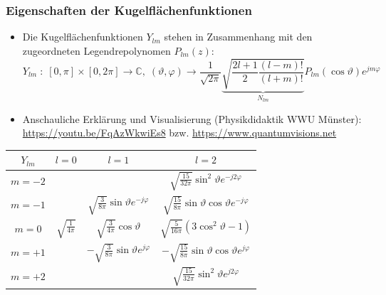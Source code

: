       \begin{frame}
        \frametitle{Eigenschaften der Kugelflächenfunktionen}
        \begin{itemize}[<+->]
        \item Die Kugelflächenfunktionen $Y_{lm}$ stehen in Zusammenhang mit den \alert{zugeordneten Legendrepolynomen} $P_{lm}(z)$:
          $$
          Y_{lm}\; :\; [0,\pi] \times [0,2\pi] \to \mathbb{C}, \; (\vartheta,\varphi) \to \frac{1}{\sqrt{2\pi}} \underbrace{\sqrt{\frac{2l+1}{2}\frac{(l-m)!}{(l+m)!}}}_{N_{lm}} P_{lm}(\cos\vartheta) e^{jm\varphi} 
          $$
          \item Anschauliche Erklärung und Visualisierung (Physikdidaktik WWU Münster): \url{https://youtu.be/FqAzWkwiEs8} bzw. \url{https://www.quantumvisions.net}
        \end{itemize}\pause

        \centering
        \begin{tabular}{c|c|c|c}
          $Y_{lm}$ & $l=0$& $l=1$& $l=2$ \\
          \hline
          $m=-2$  & & & $\sqrt{\frac{15}{32\pi}} \sin^2\vartheta e^{-j2\varphi}$\\
          $m=-1$  & & $\sqrt{\frac{3}{8\pi}} \sin\vartheta e^{-j\varphi}$ & $\sqrt{\frac{15}{8\pi}} \sin\vartheta\cos\vartheta e^{-j\varphi}$\\
          $m=0$  & $\sqrt{\frac{1}{4\pi}}$ & $\sqrt{\frac{3}{4\pi}} \cos\vartheta$ & $ \sqrt{\frac{5}{16\pi}} (3\cos^2\vartheta -1)$\\
          $m=+1$  & &$-\sqrt{\frac{3}{8\pi}} \sin\vartheta e^{j\varphi}$ & $- \sqrt{\frac{15}{8\pi}} \sin\vartheta\cos\vartheta e^{j\varphi}$\\
          $m=+2$  & & & $\sqrt{\frac{15}{32\pi}} \sin^2\vartheta e^{j2\varphi}$
          \end{tabular}
\end{frame}      

